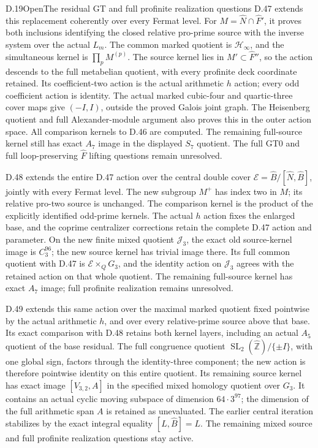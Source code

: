 \begin{statement}{D.19}{Open}{The residual GT and full profinite realization questions}
D.47 extends this replacement coherently over every Fermat level.
For \(M=\widehat N\cap\widehat F'\), it proves both inclusions
identifying the closed relative pro-prime source with the inverse
system over the actual \(L_m\). The common marked quotient is
\(\mathcal H_\infty\), and the simultaneous kernel is
\(\prod_pM^{(p)}\). The source kernel lies in \(M'\subset
\widehat F''\), so the action descends to the full metabelian
quotient, with every profinite deck coordinate retained. Its
coefficient-two action is the actual arithmetic \(h\) action;
every odd coefficient action is identity. The actual marked
cubic-four and quartic-three cover maps give \((-I,I)\), outside
the proved Galois joint graph. The Heisenberg quotient and full
Alexander-module argument also proves this in the outer action
space. All comparison kernels to D.46 are computed. The remaining
full-source kernel still has exact \(A_7\) image in the displayed
\(S_7\) quotient. The full GT0 and full loop-preserving
\(\widehat F\) lifting questions remain unresolved.

D.48 extends the entire D.47 action over the central double cover
\(\mathcal E=\widehat B/[\widehat N,\widehat B]\), jointly with
every Fermat level. The new subgroup \(M^+\) has index two in
\(M\); its relative pro-two source is unchanged. The comparison
kernel is the product of the explicitly identified odd-prime
kernels. The actual \(h\) action fixes the enlarged base, and
the coprime centralizer corrections retain the complete D.47
action and parameter. On the new finite mixed quotient
\(\mathcal J_3\), the exact old source-kernel image is
\(C_3^{96}\); the new source kernel has trivial image there.
Its full common quotient with D.47 is
\(\mathcal E\times_QG_3\), and the identity action on
\(\mathcal J_3\) agrees with the retained action on that whole
quotient. The remaining full-source kernel has exact
\(A_7\) image; full profinite realization remains unresolved.


D.49 extends this same action over the maximal marked quotient
fixed pointwise by the actual arithmetic \(h\), and over every
relative-prime source above that base. Its exact comparison
with D.48 retains both kernel layers, including an actual
\(A_5\) quotient of the base residual. The full congruence
quotient \(\operatorname{SL}_2(\widehat{\mathbb Z})/\{\pm I\}\),
with one global sign, factors through the identity-three
component; the new action is therefore pointwise identity
on this entire quotient. Its remaining source kernel has
exact image \([V_{3,2},A]\) in the specified mixed homology
quotient over \(G_3\). It contains an actual cyclic moving
subspace of dimension \(64\cdot3^{97}\); the dimension
of the full arithmetic span \(A\) is retained as unevaluated.
The earlier central iteration stabilizes by the exact
integral equality \([L,\widehat B]=L\).
The remaining mixed source and full profinite realization
questions stay active.



\end{statement}

